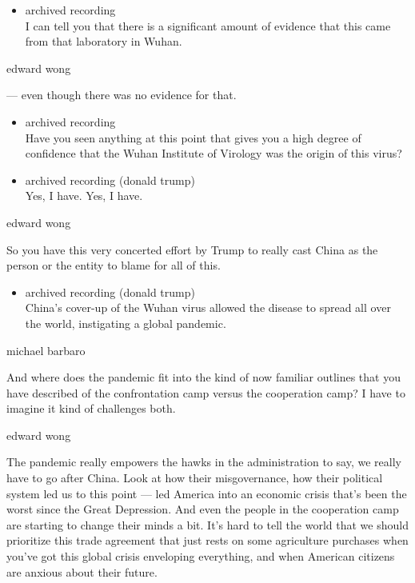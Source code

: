 \begin{itemize}
\tightlist
\item
  archived recording\\
  I can tell you that there is a significant amount of evidence that
  this came from that laboratory in Wuhan.
\end{itemize}

edward wong

--- even though there was no evidence for that.

\begin{itemize}
\item
  archived recording\\
  Have you seen anything at this point that gives you a high degree of
  confidence that the Wuhan Institute of Virology was the origin of this
  virus?
\item
  archived recording (donald trump)\\
  Yes, I have. Yes, I have.
\end{itemize}

edward wong

So you have this very concerted effort by Trump to really cast China as
the person or the entity to blame for all of this.

\begin{itemize}
\tightlist
\item
  archived recording (donald trump)\\
  China's cover-up of the Wuhan virus allowed the disease to spread all
  over the world, instigating a global pandemic.
\end{itemize}

michael barbaro

And where does the pandemic fit into the kind of now familiar outlines
that you have described of the confrontation camp versus the cooperation
camp? I have to imagine it kind of challenges both.

edward wong

The pandemic really empowers the hawks in the administration to say, we
really have to go after China. Look at how their misgovernance, how
their political system led us to this point --- led America into an
economic crisis that's been the worst since the Great Depression. And
even the people in the cooperation camp are starting to change their
minds a bit. It's hard to tell the world that we should prioritize this
trade agreement that just rests on some agriculture purchases when
you've got this global crisis enveloping everything, and when American
citizens are anxious about their future.

